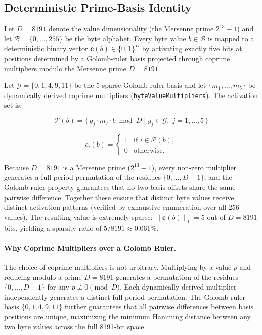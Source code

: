 \subsection{Deterministic Prime-Basis Identity}
\label{sec:base_value}
\label{sec:value_representation}

Let $D = 8191$ denote the value dimensionality (the Mersenne prime
$2^{13} - 1$) and let $\mathcal{B} = \{0, \ldots, 255\}$ be the byte
alphabet.  Every byte value $b \in \mathcal{B}$ is mapped to a deterministic
binary vector $\mathbf{c}(b) \in \{0,1\}^{D}$ by activating exactly five bits
at positions determined by a Golomb-ruler basis projected through coprime
multipliers modulo the Mersenne prime $D = 8191$.

Let $\mathcal{G} = \{0, 1, 4, 9, 11\}$ be the 5-sparse Golomb-ruler basis and
let $\{m_1, \ldots, m_5\}$ be dynamically derived coprime multipliers
(\texttt{byteValueMultipliers}).  The activation set is:

\begin{equation}
  \mathcal{P}(b) = \bigl\{\, g_j \cdot m_j \cdot b \bmod D
                   \;\big|\; g_j \in \mathcal{G},\;
                   j = 1, \ldots, 5 \,\bigr\}
  \label{eq:base_value}
\end{equation}

\begin{equation}
  c_i(b) =
  \begin{cases}
    1 & \text{if } i \in \mathcal{P}(b), \\
    0 & \text{otherwise.}
  \end{cases}
  \label{eq:indicator}
\end{equation}

\noindent Because $D = 8191$ is a Mersenne prime ($2^{13} - 1$), every
non-zero multiplier generates a full-period permutation of the residues
$\{0, \ldots, D-1\}$, and the Golomb-ruler property guarantees that no two
basis offsets share the same pairwise difference.  Together these ensure that
distinct byte values receive distinct activation patterns (verified by
exhaustive enumeration over all $256$ values).  The resulting value is
extremely sparse: $\|\mathbf{c}(b)\|_1 = 5$ out of $D = 8191$ bits, yielding
a sparsity ratio of $5/8191 \approx 0.061\%$.

\paragraph{Why Coprime Multipliers over a Golomb Ruler.}
The choice of coprime multipliers is not arbitrary.  Multiplying by a value
$p$ and reducing modulo a prime $D = 8191$ generates a permutation of the
residues $\{0, \ldots, D-1\}$ for any $p \not\equiv 0 \pmod{D}$.
Each dynamically derived multiplier independently generates a distinct
full-period permutation.  The Golomb-ruler basis $\{0, 1, 4, 9, 11\}$
further guarantees that all pairwise differences between basis positions are
unique, maximizing the minimum Hamming distance between any two byte values
across the full 8191-bit space.

